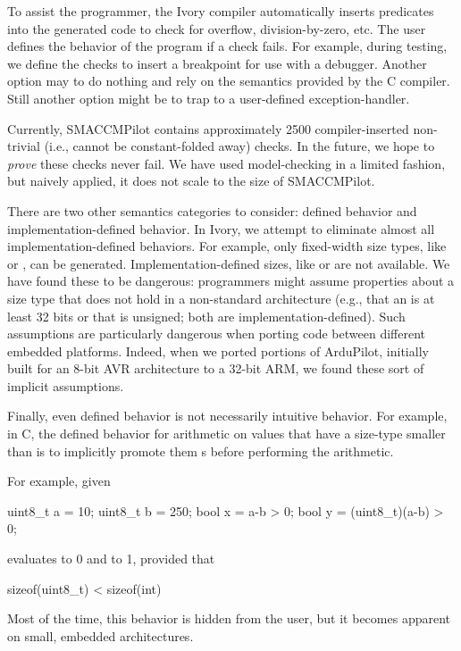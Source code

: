 To assist the programmer, the Ivory compiler automatically inserts predicates
into the generated code to check for overflow, division-by-zero, etc.  The user
defines the behavior of the program if a check fails.  For example, during
testing, we define the checks to insert a breakpoint for use with a debugger.
Another option may to do nothing and rely on the semantics provided by the C
compiler.  Still another option might be to trap to a user-defined
exception-handler.

Currently, SMACCMPilot contains approximately 2500 compiler-inserted non-trivial
(i.e., cannot be constant-folded away) checks.  In the future, we hope to
\emph{prove} these checks never fail.  We have used model-checking in a limited
fashion, but naively applied, it does not scale to the size of SMACCMPilot.

There are two other semantics categories to consider: defined behavior and
implementation-defined behavior.  In Ivory, we attempt to eliminate almost all
implementation-defined behaviors.  For example, only fixed-width size types,
like  or , can be generated.  Implementation-defined
sizes, like  or  are not available.  We have found these to be
dangerous: programmers might assume properties about a size type that does not
hold in a non-standard architecture (e.g., that an  is at least 32 bits
or that  is unsigned; both are implementation-defined).  Such
assumptions are particularly dangerous when porting code between different
embedded platforms.  Indeed, when we ported portions of ArduPilot, initially built
for an 8-bit AVR architecture to a 32-bit ARM, we found these sort of implicit
assumptions.

Finally, even defined behavior is not necessarily intuitive behavior.  For
example, in C, the defined behavior for arithmetic on values that have a
size-type smaller than  is to implicitly promote them s before
performing the arithmetic.

For example, given
\begin{code}
uint8\_t a = 10;
uint8\_t b = 250;
bool    x = a-b > 0;
bool    y = (uint8\_t)(a-b) > 0;
\end{code}
\noindent
{} evaluates to 0 and  to 1, provided that
\begin{code}
sizeof(uint8\_t) < sizeof(int)
\end{code}
\noindent
Most of the time, this behavior is hidden from the user, but it becomes apparent
on small, embedded architectures.


